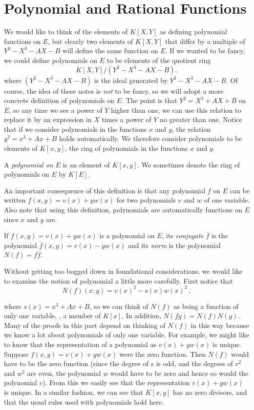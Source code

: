 \section{Polynomial and Rational Functions}

We would like to think of the elements of $K[X,Y]$ as defining polynomial functions on $E$, but clearly two elements of $K[X,Y]$ that differ by a multiple of $Y^{2}-X^{3}-AX-B$ will define the same function on $E$. If we wanted to be fancy, we could define polynomials on $E$ to be elements of the quotient ring
\[K[X,Y]/(Y^{2}-X^{3}-AX-B),\]
where $(Y^{2}-X^{3}-AX-B)$ is the ideal generated by $Y^{2}-X^{3}-AX-B$. Of course, the idea of these notes is {\it not} to be fancy, so we will adopt a more concrete definition of polynomials on $E$. The point is that $Y^{2}=X^{3}+AX+B$ on $E$, so any time we see a power of $Y$ higher than one, we can use this relation to replace it by an expression in $X$ times a power of $Y$ no greater than one. Notice that if we consider polynomials in the functions $x$ and $y$, the relation $y^{2}=x^{3}+Ax+B$ holds automatically. We therefore consider polynomials to be elements of $K[x,y]$, the ring of polynomials in the functions $x$ and $y$.

\begin{defi}
\label{d3.1}
A {\it polynomial on} $E$ is an element of $K[x,y]$. We sometimes denote the ring of polynomials on $E$ by $K[E]$.
\end{defi}

An important consequence of this definition is that any polynomial $f$ on $E$ can be written $f(x,y)=v(x)+yw(x)$ for two polynomials $v$ and $w$ of one variable. Also note that using this definition, polynomials are automatically functions on $E$ since $x$ and $y$ are.

\begin{defi}
\label{d3.2}
If $f(x,y)=v(x)+yw(x)$ is a polynomial on $E$, its {\it conjugate} $\overline{f}$ is the polynomial $\overline{f}(x,y)=v(x)-yw(x)$ and its {\it norm} is the polynomial $N(f)=f\overline{f}$.
\end{defi}

\rem
Without getting too bogged down in foundational considerations, we would like to examine the notion of polynomial a little more carefully. First notice that
$$
N(f)(x,y)=v(x)^{2}-s(x)w(x)^{2}\ ,
$$

where $s(x)=x^{3}+Ax+B$, so we can think of $N(f)$ as being a function of only one variable, \ie, a member of $K[x]$. In addition, $N(fg)=N(f)N(g)$. Many of the proofs in this part depend on thinking of $N(f)$ in this way because we know a lot about polynomials of only one variable. For example, we might like to know that the representation of a polynomial as $v(x)+yw(x)$ is unique. Suppose $f(x,y)=v(x)+yw(x)$ were the zero function. Then $N(f)$ would have to be the zero function (since the degree of $s$ is odd, and the degrees of $v^{2}$ and $w^{2}$ are even, the polynomial $w$ would have to be zero and hence so would the polynomial $v$). From this we easily see that the representation $v(x)+yw(x)$ is unique. In a similar fashion, we can see that $K[x,y]$ has no zero divisors, and that the usual rules used with polynomials hold here.

